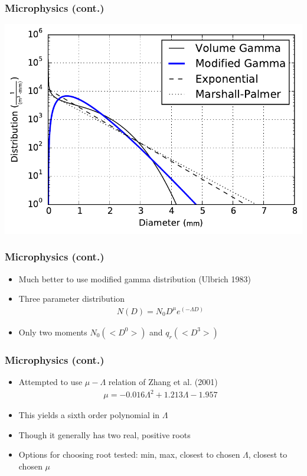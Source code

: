 \documentclass[red]{beamer}
\begin{document}
\begin{frame}
	\frametitle{Microphysics (cont.)}
	\begin{center}
		\includegraphics[scale=0.6]{figures/distribution-comparison.pdf}
	\end{center}
\end{frame}

\begin{frame}[<+->]
	\frametitle{Microphysics (cont.)}
	\begin{itemize}
		\item Much better to use modified gamma distribution (Ulbrich 1983)
		\item Three parameter distribution
		\begin{align}
			N(D) = N_0 D^\mu e^{(-\Lambda D)}
		\end{align}
		\item Only two moments $N_0 (<D^0>)$ and $q_r (<D^3>)$
	\end{itemize}
\end{frame}

\begin{frame}[<+->]
	\frametitle{Microphysics (cont.)}
	\begin{itemize}
		\item Attempted to use $\mu-\Lambda$ relation of Zhang et al. (2001)
		\begin{align}
			\mu = \num{-0.016} \Lambda^2 + \num{1.213} \Lambda - \num{1.957}
		\end{align}
		\item This yields a sixth order polynomial in $\Lambda$
		\item Though it generally has two real, positive roots
		\item Options for choosing root tested: min, max, closest to chosen $\Lambda$, closest to chosen $\mu$
	\end{itemize}
\end{frame}
\end{document}
